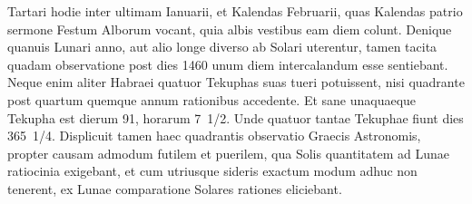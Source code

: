 Tartari hodie inter ultimam Ianuarii,
et Kalendas Februarii, quas Kalendas patrio sermone Festum Alborum
vocant, quia albis vestibus eam diem colunt.
Denique quanuis
Lunari anno, aut alio longe diverso ab Solari uterentur, tamen tacita
quadam observatione post dies 1460 unum diem intercalandum esse
sentiebant.
Neque enim aliter Habraei quatuor Tekuphas suas tueri
potuissent, nisi quadrante post quartum quemque annum rationibus accedente.
Et sane unaquaeque Tekupha est dierum 91, horarum 7~1/2.
Unde
quatuor tantae Tekuphae fiunt dies 365~1/4.
Displicuit tamen haec quadrantis
observatio Graecis Astronomis, propter causam admodum futilem
et puerilem, qua Solis quantitatem ad Lunae ratiocinia exigebant,
et cum utriusque sideris exactum modum adhuc non tenerent,
ex Lunae comparatione Solares rationes eliciebant.

